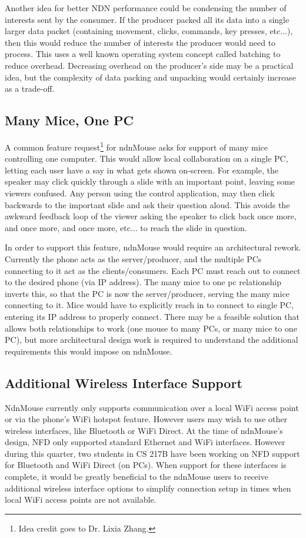 \documentclass{sig-alternate}
\renewcommand\_{\textunderscore\allowbreak}  %
\begin{document}
Another idea for better NDN performance could be condensing the number of interests sent by the consumer. If the producer packed all its data into a single larger data packet (containing movement, clicks, commands, key presses, etc...), then this would reduce the number of interests the producer would need to process. This uses a well known operating system concept called batching to reduce overhead. Decreasing overhead on the producer's side may be a practical idea, but the complexity of data packing and unpacking would certainly increase as a trade-off.

\subsection{Many Mice, One PC}
A common feature request\footnote{Idea credit goes to Dr. Lixia Zhang.} for ndnMouse asks for support of many mice controlling one computer. This would allow local collaboration on a single PC, letting each user have a say in what gets shown on-screen. For example, the speaker may click quickly through a slide with an important point, leaving some viewers confused. Any person using the control application, may then click backwards to the important slide and ask their question aloud. This avoids the awkward feedback loop of the viewer asking the speaker to click back once more, and once more, and once more, etc... to reach the slide in question.

In order to support this feature, ndnMouse would require an architectural rework. Currently the phone acts as the server/producer, and the multiple PCs connecting to it act as the clients/consumers. Each PC must reach out to connect to the desired phone (via IP address). The many mice to one pc relationship inverts this, so that the PC is now the server/producer, serving the many mice connecting to it. Mice would have to explicitly reach in to connect to single PC, entering its IP address to properly connect. There may be a feasible solution that allows both relationships to work (one mouse to many PCs, or many mice to one PC), but more architectural design work is required to understand the additional requirements this would impose on ndnMouse.

\subsection{Additional Wireless Interface Support}
NdnMouse currently only supports communication over a local WiFi access point or via the phone's WiFi hotspot feature. However users may wish to use other wireless interfaces, like Bluetooth or WiFi Direct. At the time of ndnMouse's design, NFD only supported standard Ethernet and WiFi interfaces. However during this quarter, two students in CS 217B have been working on NFD support for Bluetooth and WiFi Direct (on PCs). When support for these interfaces is complete, it would be greatly beneficial to the ndnMouse users to receive additional wireless interface options to simplify connection setup in times when local WiFi access points are not available.
\end{document}
